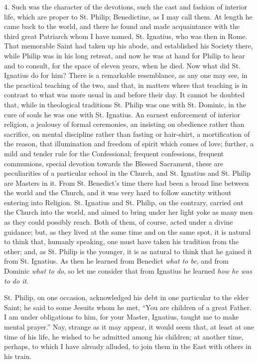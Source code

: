 4. Such was the character of the devotions, such the
cast and fashion of interior life, which are proper to
St. Philip; Benedictine, as I may call them. At length he
came back to the world, and there he found and made
acquaintance with the third great Patriarch whom I have
named, St. Ignatius, who was then in Rome. That memorable
Saint had taken up his abode, and established his Society
there, while Philip was in his long retreat, and now he
was at hand for Philip to hear and to consult, for the
space of eleven years, when he died. Now what did St.
Ignatius do for him? There is a remarkable resemblance,
as any one may see, in the practical teaching of the two,
and that, in matters where that teaching is in contrast
to what was more usual in and before their day. It cannot
be doubted that, while in theological traditions St.
Philip was one with St. Dominic, in the cure of souls he
was one with St. Ignatius. An earnest enforcement of
interior religion, a jealousy of formal ceremonies, an
insisting on obedience rather than sacrifice, on mental
discipline rather than fasting or hair-shirt, a
mortification of the reason, that illumination and
freedom of spirit which comes of love; further, a mild
and tender rule for the Confessional; frequent
confessions, frequent communions, special devotion
towards the Blessed Sacrament, these are peculiarities of
a particular school in the Church, and St. Ignatius and
St. Philip are Masters in it. From St. Benedict's time
there had been a broad line between the world and the
Church, and it was very hard to follow sanctity without
entering into Religion. St. Ignatius and St. Philip, on
the contrary, carried out the Church into the world, and
aimed to bring under her light yoke as many men as they
could possibly reach. Both of them, of course, acted
under a divine guidance; but, as they lived at the same
time and on the same spot, it is natural to think that,
humanly speaking, one must have taken his tradition from
the other; and, as St. Philip is the younger, it is as
natural to think that he gained it from St. Ignatius. As
then he learned from Benedict \emph{what to be}, and from
Dominic \emph{what to do}, so let me consider that from
Ignatius he learned \emph{how he was to do it}.

St. Philip, on one occasion, acknowledged his debt in one particular to the elder Saint; he said to some
Jesuits whom he met, ``You are children of a great
Father. I am under obligations to him, for your Master,
Ignatius, taught me to make mental prayer.'' Nay,
strange as it may appear, it would seem that, at least at
one time of his life, he wished to be admitted among his
children; at another time, perhaps, to which I have
already alluded, to join them in the East with others in
his train.

